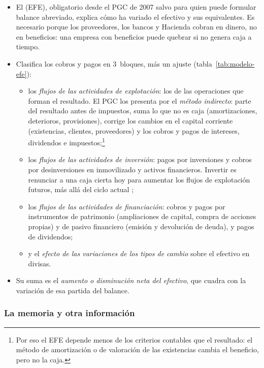\documentclass[11pt]{article}
\begin{document}
\begin{itemize}
\item El  (EFE), obligatorio desde el PGC de 2007 salvo para quien puede formular balance abreviado, explica cómo ha variado el efectivo y sus equivalentes. Es necesario porque los proveedores, los bancos y Hacienda cobran en dinero, no en beneficios: una empresa con beneficios puede quebrar si no genera caja a tiempo.
\item Clasifica los cobros y pagos en 3~bloques, más un ajuste (tabla~\ref{tab:modelo-efe}):
  \begin{itemize}
  \item los \emph{flujos de las actividades de explotación}: los de las operaciones que forman el resultado. El PGC los presenta por el \emph{método indirecto}: parte del resultado antes de impuestos, suma lo que no es caja (amortizaciones, deterioros, provisiones), corrige los cambios en el capital corriente (existencias, clientes, proveedores) y los cobros y pagos de intereses, dividendos e impuestos;\footnote{Por eso el EFE depende menos de los criterios contables que el resultado: el método de amortización o de valoración de las existencias cambia el beneficio, pero no la caja.}
  \item los \emph{flujos de las actividades de inversión}: pagos por inversiones y cobros por desinversiones en inmovilizado y activos financieros. Invertir es renunciar a una caja cierta hoy para aumentar los flujos de explotación futuros, más allá del ciclo actual ;
  \item los \emph{flujos de las actividades de financiación}: cobros y pagos por instrumentos de patrimonio (ampliaciones de capital, compra de acciones propias) y de pasivo financiero (emisión y devolución de deuda), y pagos de dividendos;
  \item y el \emph{efecto de las variaciones de los tipos de cambio} sobre el efectivo en divisas.
  \end{itemize}
\item Su suma es el \emph{aumento o disminución neta del efectivo}, que cuadra con la variación de esa partida del balance.
\end{itemize}

\subsubsection{La memoria y otra información}\label{sec:otra-informacion}
\end{document}
